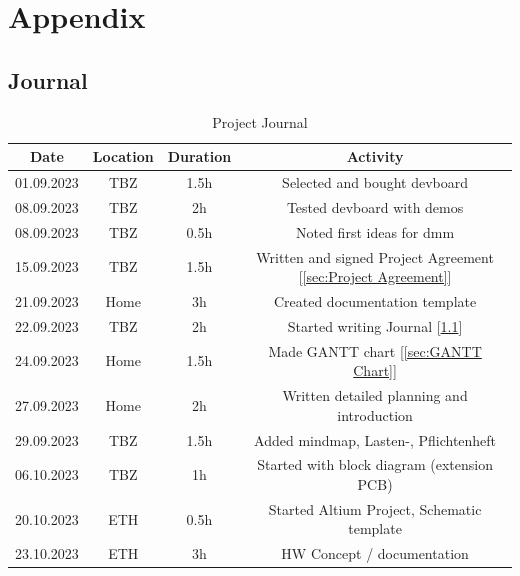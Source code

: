 \chapter{Appendix}\label{cha:Appendix}

\section{Journal}\label{sec:Journal}
\begin{table}[H]
    \centering
    
\begin{tabular}{||c | c | c || c||} 
 \hline
 Date &  Location & Duration & Activity \\ [0.5ex] 
 \hline\hline
  01.09.2023 & TBZ & 1.5h & Selected and bought \acs{devboard} \\ 
 \hline
 08.09.2023 & TBZ & 2h & Tested \acs{devboard} with demos \\ 
 \hline
  08.09.2023 & TBZ & 0.5h & Noted first ideas for \acs{dmm} \\ 
 \hline
   15.09.2023 & TBZ & 1.5h & Written and signed Project Agreement [\ref{sec:Project Agreement}] \\ 
 \hline
    21.09.2023 & Home & 3h & Created documentation template \\ 
 \hline
    22.09.2023 & TBZ & 2h &  Started writing Journal [\ref{sec:Journal}]\\ 
 \hline
    24.09.2023 & Home & 1.5h &  Made GANTT chart [\ref{sec:GANTT Chart}]\\ 
 \hline
    27.09.2023 & Home & 2h & Written detailed planning and introduction \\ 
 \hline
    29.09.2023 & TBZ & 1.5h & Added mindmap, Lasten-, Pflichtenheft \\ 
 \hline
    06.10.2023 & TBZ & 1h & Started with block diagram (extension PCB) \\ 
 \hline
    20.10.2023 & ETH & 0.5h & Started Altium Project, Schematic template \\ 
 \hline
    23.10.2023 & ETH & 3h & HW Concept / documentation \\ 
 \hline
\end{tabular}
    \caption{Project Journal}\label{tab:Project Journal}
\end{table}
\newpage

